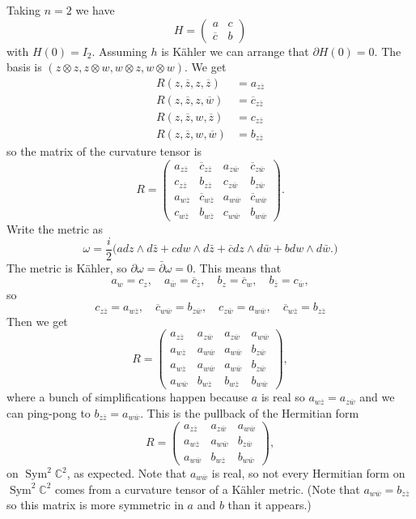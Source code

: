 \documentclass[11pt]{amsart}
\theoremstyle{definition}
\newcommand{\kk}[1]{\mathbb{#1}}
\def\ov#1{\overline{#1}}
\DeclareMathOperator{\Sym}{Sym}
\begin{document}
Taking $n = 2$ we have
$$
H = \begin{pmatrix}
a & c
\\
\ov c & b
\end{pmatrix}
$$
with $H(0) = I_2$.
Assuming $h$ is K\"ahler we can arrange that $\partial H(0) = 0$.
The basis is $(z \otimes z, z \otimes w, w \otimes z, w \otimes w)$.
We get
\begin{align*}
R(z, \ov z, z, \ov z) &= a_{z \ov z}
\\
R(z, \ov z, z, \ov w) &= \ov c_{z \ov z}
\\
R(z, \ov z, w, \ov z) &= c_{z \ov z}
\\
R(z, \ov z, w, \ov w) &= b_{z \ov z}
\end{align*}
so the matrix of the curvature tensor is
$$
R = \begin{pmatrix}
a_{z \ov z} & \ov c_{z \ov z} & a_{z \ov w} & \ov c_{z \ov w}
\\
c_{z \ov z} & b_{z \ov z} & c_{z \ov w} & b_{z \ov w}
\\
a_{w \ov z} & \ov c_{w \ov z} & a_{w \ov w} & \ov c_{w \ov w}
\\
c_{w \ov z} & b_{w \ov z} & c_{w \ov w} & b_{w \ov w}
\end{pmatrix}.
$$
Write the metric as
$$
\omega
= \frac i2 \bigl(
a dz \wedge d\bar z
+ c dw \wedge d \bar z
+ \ov c dz \wedge d\bar w
+ b dw \wedge d\bar w.
\bigr)
$$
The metric is K\"ahler, so $\partial \omega = \bar\partial \omega = 0$.
This means that
$$
a_w = c_{z},
\quad
a_{\ov w} = \ov c_{\ov z},
\quad
b_z = \ov c_w,
\quad
b_{\ov z} = c_{\ov w},
$$
so
$$
c_{z \ov z} = a_{w \ov z},
\quad
\ov c_{w \ov w} = b_{z \ov w},
\quad
c_{z \ov w} = a_{w \ov w},
\quad
\ov c_{w \ov z} = b_{z \ov z}
$$
Then we get
$$
R = \begin{pmatrix}
a_{z \ov z} & a_{z \ov w} & a_{z \ov w} & a_{w \ov w}
\\
a_{w \ov z} & a_{w \ov w} & a_{w \ov w} & b_{z \ov w}
\\
a_{w \ov z} & a_{w \ov w} & a_{w \ov w} & b_{z \ov w}
\\
a_{w \ov w} & b_{w \ov z} & b_{w \ov z} & b_{w \ov w}
\end{pmatrix},
$$
where a bunch of simplifications happen because $a$ is real so $a_{w \ov z} =
a_{z \ov w}$ and we can ping-pong to $b_{z \ov z} = a_{w \ov w}$.
This is the pullback of the Hermitian form
$$
R = \begin{pmatrix}
a_{z \ov z} & a_{z \ov w} & a_{w \ov w}
\\
a_{w \ov z} & a_{w \ov w} & b_{z \ov w}
\\
a_{w \ov w} & b_{w \ov z} & b_{w \ov w}
\end{pmatrix},
$$
on $\Sym^2 \kk C^2$, as expected.
Note that $a_{w \ov w}$ is real, so not every Hermitian form on
$\Sym^2 \kk C^2$ comes from a curvature tensor of a K\"ahler metric.
(Note that $a_{w \ov w} = b_{z \ov z}$ so this matrix is more symmetric in $a$
and $b$ than it appears.)
\end{document}
